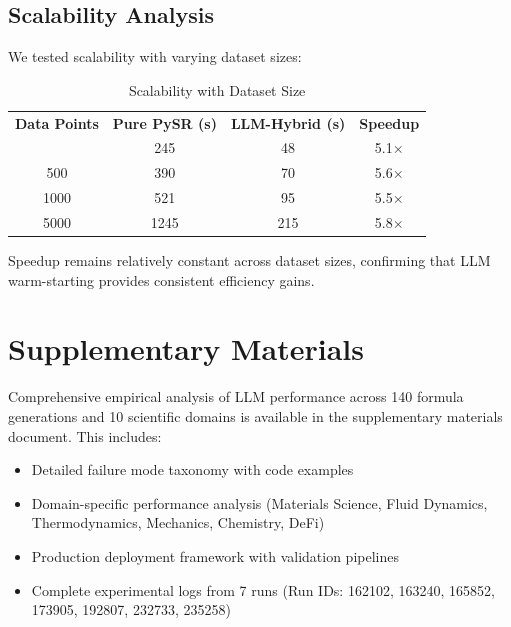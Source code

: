 \documentclass[twoside,11pt]{article}
\begin{document}
\subsection{Scalability Analysis}

We tested scalability with varying dataset sizes:

\begin{table}[H]
\centering
\caption{Scalability with Dataset Size}
\label{tab:scalability}
\begin{tabular}{@{}cccc@{}}
\toprule
\textbf{Data Points} & \textbf{Pure PySR (s)} & \textbf{LLM-Hybrid (s)} & \textbf{Speedup} \\\citep{kambhampati2024llms}
\midrule
100 & 245 & 48 & 5.1$\times$ \\
500 & 390 & 70 & 5.6$\times$ \\
1000 & 521 & 95 & 5.5$\times$ \\
5000 & 1245 & 215 & 5.8$\times$ \\
\bottomrule
\end{tabular}
\end{table}

Speedup remains relatively constant across dataset sizes, confirming that LLM warm-starting provides consistent efficiency gains\citep{kambhampati2024llms}.


\section*{Supplementary Materials}

Comprehensive empirical analysis of LLM performance across 140 formula generations and 10 scientific domains is available in the supplementary materials document\citep{virtanen2020scipy}\citep{kambhampati2024llms}. This includes:

\begin{itemize}
\item Detailed failure mode taxonomy with code examples
\item Domain-specific performance analysis (Materials Science, Fluid Dynamics, Thermodynamics, Mechanics, Chemistry, DeFi)
\item Production deployment framework with validation pipelines
\item Complete experimental logs from 7 runs (Run IDs: 162102, 163240, 165852, 173905, 192807, 232733, 235258)
\end{itemize}
\end{document}
